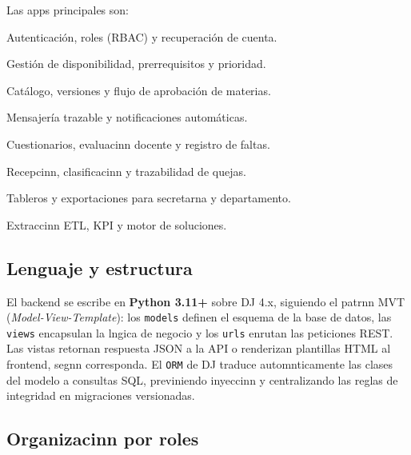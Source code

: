 Las apps principales son:

\begin{description}[leftmargin=2.2cm, labelwidth=2cm]
  \item[usuario] Autenticación, roles (\ac{RBAC}) y recuperación de cuenta.
  \item[cupos] Gestión de disponibilidad, prerrequisitos y prioridad.
  \item[materias] Catálogo, versiones y flujo de aprobación de materias.
  \item[mensajes] Mensajería trazable y notificaciones automáticas.
  \item[evaluaciones] Cuestionarios, evaluacinn docente y registro de faltas.
  \item[quejas] Recepcinn, clasificacinn y trazabilidad de quejas.
  \item[reportes] Tableros y exportaciones para secretarna y departamento.
  \item[analitica] Extraccinn \ac{ETL}, \ac{KPI} y motor de soluciones.
\end{description}

\subsection{Lenguaje y estructura}
\label{sec:backend-lenguaje}

El backend se escribe en \textbf{Python 3.11+} sobre \ac{DJ} 4.x, siguiendo el
patrnn \ac{MVT} (\textit{Model-View-Template}): los \texttt{models} definen el
esquema de la base de datos, las \texttt{views} encapsulan la lngica de
negocio y los \texttt{urls} enrutan las peticiones \ac{REST}. Las vistas
retornan respuesta \ac{JSON} a la API o renderizan plantillas \ac{HTML} al
frontend, segnn corresponda. El \texttt{ORM} de \ac{DJ} traduce
automnticamente las clases del modelo a consultas \ac{SQL}, previniendo
inyeccinn y centralizando las reglas de integridad en migraciones versionadas.

\subsection{Organizacinn por roles}
\label{sec:backend-rol}

